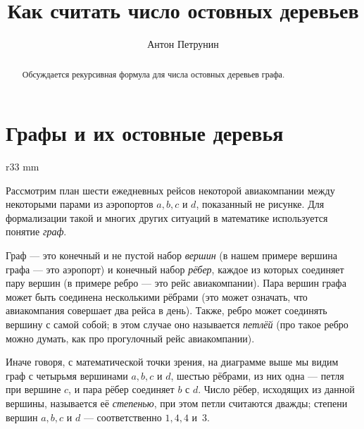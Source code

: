 \documentclass{article}
\begin{document}
\title{Как считать число остовных деревьев}
\author{Антон Петрунин}
\date{}
\maketitle

\begin{abstract}
Обсуждается рекурсивная формула для числа остовных деревьев графа.
\end{abstract}



\section{Графы и их остовные деревья}

\begin{wrapfigure}{r}{33 mm}
\end{wrapfigure}

Рассмотрим план шести ежедневных рейсов некоторой авиакомпании между некоторыми парами из аэропортов $a,b,c$ и $d$,
показанный не рисунке.
Для формализации такой и многих других ситуаций в математике используется понятие \emph{граф}.

Граф --- это конечный и не пустой набор \emph{вершин} (в нашем примере вершина графа --- это аэропорт) 
и конечный набор \emph{рёбер}, каждое из которых соединяет пару вершин (в примере ребро --- это рейс авиакомпании).
Пара вершин графа может быть соединена несколькими рёбрами (это может означать, что авиакомпания совершает два рейса в день). 
Также, ребро может соединять вершину с самой собой; в этом случае оно называется \emph{петлёй} (про такое ребро можно думать, как про прогулочный рейс авиакомпании).

Иначе говоря, с математической точки зрения, на диаграмме выше мы видим граф с четырьмя вершинами $a,b,c$ и $d$, 
шестью рёбрами, из них
одна --- петля при вершине $c$, и пара рёбер соединяет $b$ с $d$.
Число рёбер, исходящих из данной вершины, называется её \emph{степенью}, при этом петли считаются дважды;
степени вершин $a,b,c$ и $d$ --- соответственно $1,4,4$ и~$3$.
\end{document}
